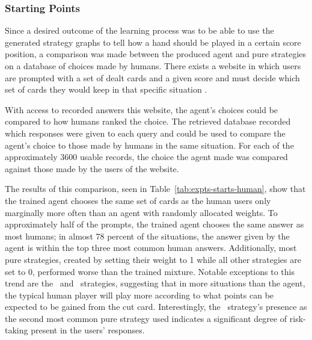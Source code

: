 

\subsubsection*{Starting Points}
\label{sec:findings-expts-starts}

Since a desired outcome of the learning process was to be able to use the
generated strategy graphs to tell how a hand should be played in a
certain score position,
a comparison was made between the produced agent and pure strategies
on a database of choices made by humans.
%
There exists a website in which users are prompted with a set of dealt cards and
a given score and must decide which set of cards they would keep in that
specific situation
\cite{dailycribbagehand}.

With access to recorded answers this website,
the agent's choices could be compared to how humans ranked the choice.
%
The retrieved database recorded which responses were given to each query
and could be used to compare the agent's choice
to those made by humans in the same situation.
%
For each of the approximately 3600 usable records,
the choice the agent made was compared against those made by the users of the
website.

The results of this comparison,
seen in Table~\ref{tab:expts-starts-human}, %
show that the trained agent chooses the same
set of cards as the human users only marginally more often than an agent with 
randomly allocated weights.
%
To approximately half of the prompts,
the trained agent chooses the same answer as most humans;
in almost 78 percent of the situations,
the answer given by the agent is within the top three most common human answers.
%
Additionally,
most pure strategies,
created by setting their weight to 1 while all other strategies are set to 0,
performed worse than the trained mixture.
%
Notable exceptions to this trend are the \handmaxposs\ and \handmaxavg\ 
strategies,
suggesting that in more situations than the agent,
the typical human player will play more according to what points can be expected
to be gained from the cut card.
%
Interestingly,
the \handmaxposs\ strategy's presence as the second most common pure strategy
used indicates a significant degree of risk-taking present in the users'
responses.

